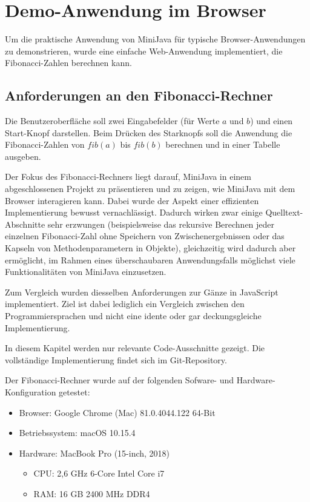 \chapter{Demo-Anwendung im Browser}
\label{cha:DemoAnwendung}

Um die praktische Anwendung von MiniJava für typische Browser-Anwendungen zu demonstrieren, wurde eine einfache Web-Anwendung implementiert, die Fibonacci-Zahlen berechnen kann.

\section{Anforderungen an den Fibonacci-Rechner}
Die Benutzeroberfläche soll zwei Eingabefelder (für Werte $a$ und $b$) und einen Start-Knopf darstellen. Beim Drücken des Starknopfs soll die Anwendung die Fibonacci-Zahlen von $fib(a)$ bis $fib(b)$ berechnen und in einer Tabelle ausgeben.

Der Fokus des Fibonacci-Rechners liegt darauf, MiniJava in einem abgeschlossenen Projekt zu präsentieren und zu zeigen, wie MiniJava mit dem Browser interagieren kann. Dabei wurde der Aspekt einer effizienten Implementierung bewusst vernachlässigt. Dadurch wirken zwar einige Quelltext-Abschnitte sehr erzwungen (beispielsweise das rekursive Berechnen jeder einzelnen Fibonacci-Zahl ohne Speichern von Zwischenergebnissen oder das Kapseln von Methodenparametern in Objekte), gleichzeitig wird dadurch aber ermöglicht, im Rahmen eines überschaubaren Anwendungsfalls möglichst viele Funktionalitäten von MiniJava einzusetzen.

Zum Vergleich wurden diesselben Anforderungen zur Gänze in JavaScript implementiert. Ziel ist dabei lediglich ein Vergleich zwischen den Programmiersprachen und nicht eine idente oder gar deckungsgleiche Implementierung.

In diesem Kapitel werden nur relevante Code-Ausschnitte gezeigt. Die vollständige Implementierung findet sich im Git-Repository.

Der Fibonacci-Rechner wurde auf der folgenden Sofware- und Hardware-Konfiguration getestet:
\begin{itemize}
    \item Browser: Google Chrome (Mac) 81.0.4044.122 64-Bit
    \item Betriebssystem: macOS 10.15.4
    \item Hardware: MacBook Pro (15-inch, 2018)
    \begin{itemize}
        \item CPU: 2,6 GHz 6-Core Intel Core i7
        \item RAM: 16 GB 2400 MHz DDR4
    \end{itemize}
\end{itemize}

